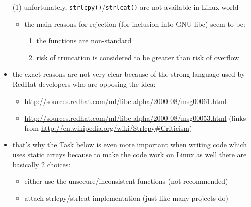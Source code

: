 \begin{itemize}
  \item[(1)] unfortunately, \texttt{strlcpy()}/\texttt{strlcat()} are not
  available in Linux world
    \begin{itemize}
    \item the main reasons for rejection (for inclusion into GNU libc) seem
      to be:
      \begin{enumerate}
      \item the functions are non-standard
      \item risk of truncation is considered to be greater than risk of overflow
      \end{enumerate}
    \end{itemize}
    \item the exact reasons are not very clear because of the strong language
      used by RedHat developers who are opposing the idea:
    \begin{itemize}
      \item \url{http://sources.redhat.com/ml/libc-alpha/2000-08/msg00061.html}
      \item \url{http://sources.redhat.com/ml/libc-alpha/2000-08/msg00053.html}
        (links from \url{http://en.wikipedia.org/wiki/Strlcpy\#Criticism})
    \end{itemize}
    \item that's why the Task below is even more important when writing
      code which uses static arrays because to make the code work on Linux
      as well there are basically 2 choices:
      \begin{itemize}
        \item either use the unsecure/inconsistent functions (not recommended)
	\item attach strlcpy/strlcat implementation (just like many projects do)
      \end{itemize}
\end{itemize}

